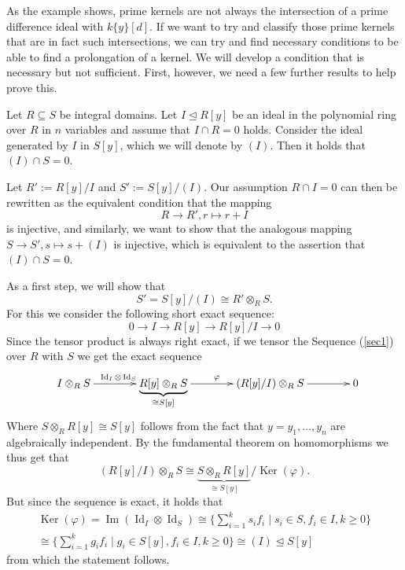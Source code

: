As the example shows, prime kernels are not always the intersection of a prime difference ideal with $k\{y\}[d]$. 
If we want to try and classify those prime kernels that are in fact such intersections, we can try and find necessary conditions to be able to find a prolongation of a kernel. 
We will develop a condition that is necessary but not sufficient. First, however, we need a few further results to help prove this.

\begin{prop} \label{idealzeroabove}
Let $R \subseteq S$ be integral domains. Let $I \unlhd R[y]$ be an ideal in the polynomial ring over $R$ in $n$ variables and assume that
$I \cap R = 0$ holds. Consider the ideal generated by $I$ in $S[y]$, which we will denote by $(I)$. 
Then it holds that $(I) \cap S = 0$.
\begin{bew}
Let $R':= R[y]/I$ and $S' := S[y]/(I)$. 
Our assumption $R \cap I = 0$ can then be rewritten as the equivalent condition that the mapping 
$$  R \rightarrow R', r \mapsto r + I $$
is injective, and similarly, we want to show that the analogous mapping $S \rightarrow S', s \mapsto s + (I)$ is injective, 
which is equivalent to the assertion that $(I) \cap S = 0$.

As a first step, we will show that 
$$ S' = S[y]/(I) \cong R' \otimes_R S.$$
For this we consider the following short exact sequence:
\begin{equation}\label{sec1}
0 \rightarrow I \rightarrow R[y] \rightarrow R[y]/I \rightarrow 0
\end{equation}
Since the tensor product is always right exact, if we tensor the Sequence (\ref{sec1}) over $R$ with $S$ we get the exact sequence
\[
\begin{xy}
\xymatrixcolsep{3.2pc}
 \xymatrix{
I \otimes_R S \ar[r]^{\operatorname{Id}_I \otimes \operatorname{Id}_S} & \underbrace{ R[y] \otimes_R S}_{\cong S[y]} \ar[r]^\varphi & (R[y]/I) \otimes_R S  \ar[r] &  0 }
\end{xy}
\]
Where $S \otimes_R R[y] \cong S[y]$ follows from the fact that $y = y_1,\ldots,y_n$ are algebraically independent.  By the fundamental theorem on homomorphisms we thus get that $$(R[y]/I) \otimes_R S \cong \underbrace{ S \otimes_R R[y]}_{\cong S[y]}/\operatorname{Ker}(\varphi).$$
But since the sequence is exact, it holds that 
\begin{align*} \operatorname{Ker}(\varphi) = \operatorname{Im}(\operatorname{Id}_I \otimes \operatorname{Id}_S) \cong \{ \sum_{i = 1}^k s_i f_i \mid s_i \in S, f_i \in I, k \geq 0 \} \\ \cong  \{ \sum_{i = 1}^k g_i f_i \mid g_i \in S[y], f_i \in I, k \geq 0 \} \cong (I) \unlhd S[y] \end{align*}
from which the statement follows.



\end{bew}
\end{prop}
